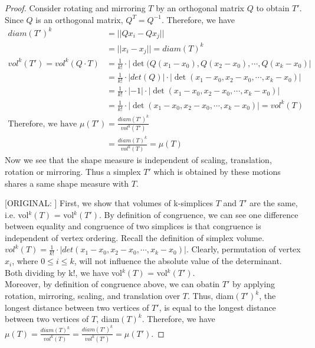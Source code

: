 \begin{proof}
    Consider rotating and mirroring $T$ by an orthogonal matrix $Q$ to obtain $T'$. Since $Q$ is an orthogonal matrix, $Q^T = Q^{-1}$. Therefore, we have
    \begin{align*}
    diam(T')^k &= ||Qx_i - Qx_j||\\
               &= ||x_i - x_j|| = diam(T)^k&&\\
    vol^k(T') = vol^k(Q\cdot T) &= \frac{1}{k!}\cdot |\det(Q(x_1-x_0), Q(x_2-x_0),\cdots, Q(x_k-x_0)|\\
                                &= \frac{1}{k!}\cdot|det(Q)|\cdot|\det(x_1-x_0, x_2-x_0, \cdots, x_k-x_0)|\\
                                &= \frac{1}{k!}\cdot|-1|\cdot|\det(x_1-x_0, x_2-x_0, \cdots, x_k-x_0)|\\
                                &= \frac{1}{k!}\cdot|\det(x_1-x_0, x_2-x_0, \cdots, x_k-x_0)| = vol^k(T)\\
    \text{Therefore, we have } \mu(T') &= \frac{diam(T')^k}{vol^k(T')}\\
    &= \frac{diam(T)^k}{vol^k(T)} = \mu(T)
    \end{align*}
    Now we see that the shape measure is independent of scaling, translation, rotation or mirroring. Thus a simplex $T'$ which is obtained by these motions shares a same shape measure with $T$.
    
    [ORIGINAL: ]
    First, we show that volumes of k-simplices $T$ and $T'$ are the same, i.e. vol$^k (T)$ = vol$^k (T')$. By definition of congruence, we can see one difference between equality and congruence of two simplices is that congruence is independent of vertex ordering. Recall the definition of simplex volume. \(vol^k(T) = \displaystyle \frac{1}{k!}\cdot|det(x_1-x_0, x_2-x_0,\cdots, x_k-x_0)|\). Clearly, permutation of vertex $x_i$, where $0 \leq i \leq k$, will not influence the absolute value of the determinant. Both dividing by k!, we have vol$^k (T)$ = vol$^k (T')$.\\
    Moreover, by definition of congruence above, we can obatin $T'$ by applying rotation, mirroring, scaling, and translation over $T$. Thus, diam$(T')^k$, the longest distance between two vertices of $T'$, is equal to the longest distance between two vertices of $T$, diam$(T)^k$. Therefore, we have $\mu(T) = \frac{diam(T)^k}{vol^k(T)} = \frac{diam(T')^k}{vol^k(T')} = \mu(T')$.
    \end{proof}